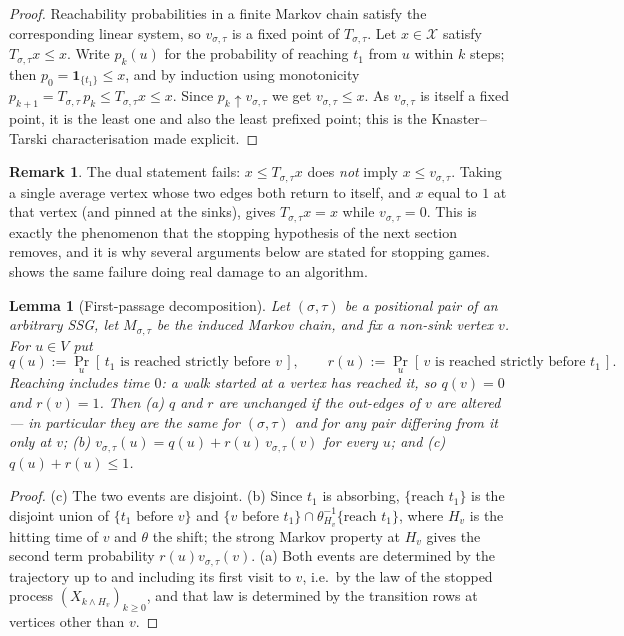\documentclass[11pt]{article}
\theoremstyle{plain}
\newtheorem{lemma}[theorem]{Lemma}
\theoremstyle{definition}
\newtheorem{remark}[theorem]{Remark}
\newcommand{\bbone}{\mathbf{1}}
\begin{document}
\begin{proof}
Reachability probabilities in a finite Markov chain satisfy the
corresponding linear system, so $v_{\sigma,\tau}$ is a fixed point of
$T_{\sigma,\tau}$. Let $x\in\mathcal{X}$ satisfy
$T_{\sigma,\tau}x\le x$. Write $p_k(u)$ for the probability of reaching
$t_1$ from $u$ within $k$ steps; then $p_0=\bbone_{\{t_1\}}\le x$, and by
induction using monotonicity
$p_{k+1}=T_{\sigma,\tau}\,p_k\le T_{\sigma,\tau}x\le x$. Since
$p_k\uparrow v_{\sigma,\tau}$ we get $v_{\sigma,\tau}\le x$. As
$v_{\sigma,\tau}$ is itself a fixed point, it is the least one and also
the least prefixed point; this is the Knaster--Tarski characterisation
made explicit.
\end{proof}

\begin{remark}\label{rem:no-postfixed}
The dual statement fails: $x\le T_{\sigma,\tau}x$ does \emph{not} imply
$x\le v_{\sigma,\tau}$. Taking a single average vertex whose two edges
both return to itself, and $x$ equal to $1$ at that vertex (and pinned at
the sinks), gives $T_{\sigma,\tau}x=x$ while
$v_{\sigma,\tau}=0$. This is exactly the phenomenon that the stopping
hypothesis of the next section removes, and it is why several arguments
below are stated for stopping games.  shows the same
failure doing real damage to an algorithm.
\end{remark}
\begin{lemma}[First-passage decomposition]\label{lem:excursion}
Let $(\sigma,\tau)$ be a positional pair of an arbitrary SSG, let
$M_{\sigma,\tau}$ be the induced Markov chain, and fix a non-sink vertex
$v$. For $u\in V$ put
\[
  q(u):=\Pr_u[\,t_1\text{ is reached strictly before }v\,],\qquad
  r(u):=\Pr_u[\,v\text{ is reached strictly before }t_1\,].
\]
Reaching includes time $0$: a walk started at a vertex has reached it, so
$q(v)=0$ and $r(v)=1$.
Then \emph{(a)} $q$ and $r$ are unchanged if the out-edges of $v$ are
altered --- in particular they are the same for $(\sigma,\tau)$ and for
any pair differing from it only at $v$; \emph{(b)}
$v_{\sigma,\tau}(u)=q(u)+r(u)\,v_{\sigma,\tau}(v)$ for every $u$; and
\emph{(c)} $q(u)+r(u)\le1$.
\end{lemma}

\begin{proof}
(c) The two events are disjoint. (b) Since $t_1$ is absorbing,
$\{\text{reach }t_1\}$ is the disjoint union of
$\{t_1\text{ before }v\}$ and
$\{v\text{ before }t_1\}\cap\theta_{H_v}^{-1}\{\text{reach }t_1\}$, where
$H_v$ is the hitting time of $v$ and $\theta$ the shift; the strong
Markov property at $H_v$ gives the second term probability
$r(u)v_{\sigma,\tau}(v)$. (a) Both events are determined by the
trajectory up to and including its first visit to $v$, i.e.\ by the law
of the stopped process $(X_{k\wedge H_v})_{k\ge0}$, and that law is
determined by the transition rows at vertices other than $v$.
\end{proof}
\end{document}
